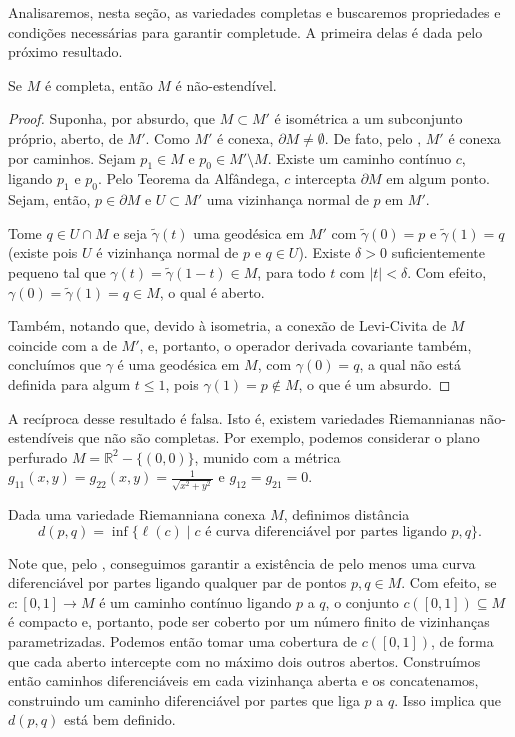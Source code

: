 Analisaremos, nesta seção, as variedades completas e buscaremos propriedades e condições necessárias para garantir completude. A primeira delas é dada pelo próximo resultado.
\begin{proposition}
    \label{prop:completa-nao-estendivel}
    Se $M$ é completa, então $M$ é não-estendível.
    \begin{proof}

        Suponha, por absurdo, que $M \subset M'$ é isométrica a um subconjunto próprio, aberto, de $M'$. Como $M'$ é conexa, $\partial M \neq \emptyset$. De fato, pelo , $M'$ é conexa por caminhos. Sejam $p_1 \in M$ e $p_0 \in M' \setminus M$. Existe um caminho contínuo $c$, ligando $p_1$ e $p_0$. Pelo Teorema da Alfândega, $c$ intercepta $\partial M$ em algum ponto. Sejam, então, $p \in \partial M$ e $U \subset M'$ uma vizinhança normal de $p$ em $M'$.

        Tome $q \in U \cap M$ e seja $\tilde{\gamma}(t)$ uma geodésica em $M'$ com $\tilde{\gamma}(0) = p$ e $\tilde{\gamma}(1) = q$ (existe pois $U$ é vizinhança normal de $p$ e $q \in U$).
        Existe $\delta > 0$ suficientemente pequeno tal que $\gamma(t) = \tilde{\gamma}(1-t) \in M$, para todo $t$ com $|t| < \delta$. Com efeito, $\gamma(0) = \tilde{\gamma}(1) = q \in M$, o qual é aberto.

        Também, notando que, devido à isometria, a conexão de Levi-Civita de $M$ coincide com a de $M'$, e, portanto, o operador derivada covariante também, concluímos que $\gamma$ é uma geodésica em $M$, com $\gamma(0) = q$, a qual não está definida para algum $t \leq 1$, pois $\gamma(1) = p \notin M$, o que é um absurdo.
    \end{proof}
\end{proposition}
A recíproca desse resultado é falsa. Isto é, existem variedades Riemannianas não-estendíveis que não são completas. Por exemplo, podemos considerar o plano perfurado $M=\mathbb{R}^{2}-\{ (0,0) \}$, munido com a métrica $g_{11}(x,y)=g_{22}(x,y)=\frac{1}{\sqrt{ x^{2}+y^{2} }}$ e $g_{12}=g_{21}=0$.
\begin{definition}
    \label{def:distancia}
    Dada uma variedade Riemanniana conexa $M$, definimos distância
    \begin{equation*}
        d(p,q) = \inf\{\ell(c) \mid c \text{ é curva diferenciável por partes ligando } p, q\}.
    \end{equation*}
\end{definition}
Note que, pelo , conseguimos garantir a existência de pelo menos uma curva diferenciável por partes ligando qualquer par de pontos $p,q \in M$. Com efeito, se $c:[0,1]\to M$ é um caminho contínuo ligando $p$ a $q$, o conjunto $c([0,1])\subseteq M$ é compacto e, portanto, pode ser coberto por um número finito de vizinhanças parametrizadas. Podemos então tomar uma cobertura de $c([0,1])$, de forma que cada aberto intercepte com no máximo dois outros abertos. Construímos então caminhos diferenciáveis em cada vizinhança aberta e os concatenamos, construindo um caminho diferenciável por partes que liga $p$ a $q$. Isso implica que $d(p,q)$ está bem definido.

